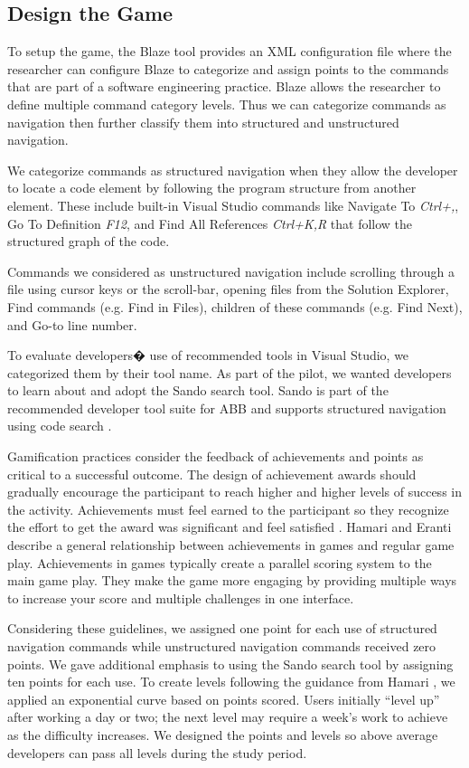 \documentclass{sig-alternate}
\begin{document}
\subsection{Design the Game}

To setup the game, the Blaze tool provides an XML configuration file where the researcher can configure Blaze to categorize and assign points to the commands that are part of a software engineering practice.  Blaze allows the researcher to define multiple command category levels.  Thus we can categorize commands as navigation then further classify them into structured and unstructured navigation.  

We categorize commands as structured navigation when they allow the developer to locate a code element by following the program structure from another element.  These include  built-in Visual Studio commands like Navigate To \textit{Ctrl+,}, Go To Definition \textit{F12}, and Find All References \textit{Ctrl+K,R}  that follow the structured graph of the code.

Commands we considered as unstructured navigation include scrolling through a file using cursor keys or the scroll-bar, opening files from the Solution Explorer, Find commands (e.g. Find in Files), children of these commands (e.g. Find Next), and Go-to line number.

To evaluate developers� use of recommended tools in Visual Studio, we categorized them by their tool name.  As part of the pilot, we wanted developers to learn about and adopt the Sando search tool.  Sando is part of the recommended developer tool suite for ABB and supports structured navigation using code search \cite{Shepherd2012Sando}.

Gamification practices consider the feedback of achievements and points as critical to a successful outcome.  The design of achievement awards should gradually encourage the participant to reach higher and higher levels of success in the activity.  Achievements must feel earned to the participant so they recognize the effort to get the award was significant and feel satisfied  \cite{wbsnipes:Hamari2011Framework}.  Hamari and Eranti describe a general relationship between achievements in games and regular game play.     Achievements in games typically create a parallel scoring system to the main game play.  They make the game more engaging by providing multiple ways to increase your score and multiple challenges in one interface.

Considering these guidelines, we assigned one point for each use of structured navigation commands while unstructured navigation commands received zero points.    We gave additional emphasis to using the Sando search tool by assigning ten points for each use.  To create levels following the guidance from Hamari \cite{wbsnipes:Hamari2011Framework}, we applied an exponential curve based on points scored.  Users initially ``level up'' after  working a day or two; the next level may require a week's work to achieve as the difficulty increases.  We designed the points and levels so above average developers can pass all levels during the study period.
\end{document}
